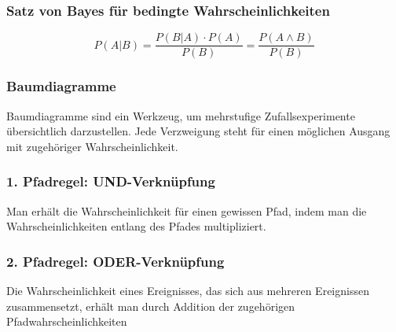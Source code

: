 \subsubsection*{Satz von Bayes für bedingte Wahrscheinlichkeiten}
\begin{equation}
    P(A|B) = \frac{P(B|A) \cdot P(A)}{P(B)} = \frac{P(A \land B)}{P(B)}
\end{equation}

\subsubsection{Baumdiagramme}
Baumdiagramme sind ein Werkzeug, um mehrstufige Zufallsexperimente übersichtlich darzustellen. Jede Verzweigung steht für einen möglichen Ausgang mit zugehöriger Wahrscheinlichkeit.
\subsubsection*{1. Pfadregel: UND-Verknüpfung}
Man erhält die Wahrscheinlichkeit für einen gewissen Pfad, indem man die Wahrscheinlichkeiten entlang des Pfades multipliziert.
\subsubsection*{2. Pfadregel: ODER-Verknüpfung}
Die Wahrscheinlichkeit eines Ereignisses, das sich aus mehreren Ereignissen zusammensetzt, erhält man durch Addition der zugehörigen Pfadwahrscheinlichkeiten


